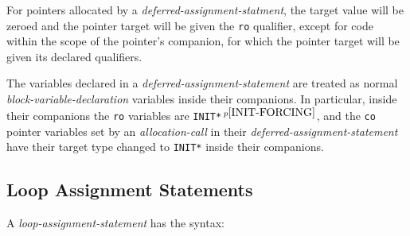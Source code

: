 \documentclass[12pt]{article}
\newcommand{\pagnote}[1]{$\,^{p\pageref{#1}}$}
\begin{document}
For pointers allocated by a {\em deferred-assignment-statment},
the target value will be zeroed and
the pointer target will be given the {\tt ro} qualifier, except for
code within the scope of the pointer's companion,
for which the pointer target will be given its declared qualifiers.


The variables declared in a {\em deferred-assignment-statement} are treated as
normal {\em block-vari\-able-declaration} variables inside their companions.
In particular, inside their companions
the {\tt ro} variables are {\tt *INIT*}\pagnote{INIT-FORCING},
and the {\tt co} pointer variables set by
an {\em allocation-call} in their {\em deferred-assignment-statement}
have their target type changed to {\tt *INIT*}
inside their companions.

\subsection{Loop Assignment Statements}
\label{LOOP-ASSIGNMENT-STATEMENTS}

A {\em loop-assignment-statement} has the syntax:
\end{document}
